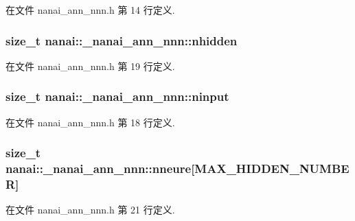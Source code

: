 在文件 nanai\+\_\+ann\+\_\+nnn.\+h 第 14 行定义.

\hypertarget{structnanai_1_1__nanai__ann__nnn_a1da94c33f6b4599404417479b858f2f2}{}
\subsubsection[{nhidden}]{\setlength{\rightskip}{0pt plus 5cm}size\+\_\+t nanai\+::\+\_\+nanai\+\_\+ann\+\_\+nnn\+::nhidden}\label{structnanai_1_1__nanai__ann__nnn_a1da94c33f6b4599404417479b858f2f2}


在文件 nanai\+\_\+ann\+\_\+nnn.\+h 第 19 行定义.

\hypertarget{structnanai_1_1__nanai__ann__nnn_a8f4a167d7f34af6615a846c9af01dd10}{}
\subsubsection[{ninput}]{\setlength{\rightskip}{0pt plus 5cm}size\+\_\+t nanai\+::\+\_\+nanai\+\_\+ann\+\_\+nnn\+::ninput}\label{structnanai_1_1__nanai__ann__nnn_a8f4a167d7f34af6615a846c9af01dd10}


在文件 nanai\+\_\+ann\+\_\+nnn.\+h 第 18 行定义.

\hypertarget{structnanai_1_1__nanai__ann__nnn_a941eeb9bbbf91e6366ad0a3e6b9db187}{}
\subsubsection[{nneure}]{\setlength{\rightskip}{0pt plus 5cm}size\+\_\+t nanai\+::\+\_\+nanai\+\_\+ann\+\_\+nnn\+::nneure\mbox{[}{\bf M\+A\+X\+\_\+\+H\+I\+D\+D\+E\+N\+\_\+\+N\+U\+M\+B\+E\+R}\mbox{]}}\label{structnanai_1_1__nanai__ann__nnn_a941eeb9bbbf91e6366ad0a3e6b9db187}


在文件 nanai\+\_\+ann\+\_\+nnn.\+h 第 21 行定义.

\hypertarget{structnanai_1_1__nanai__ann__nnn_aa0dc46c72569cc28a7e6282413d1a68f}{}
